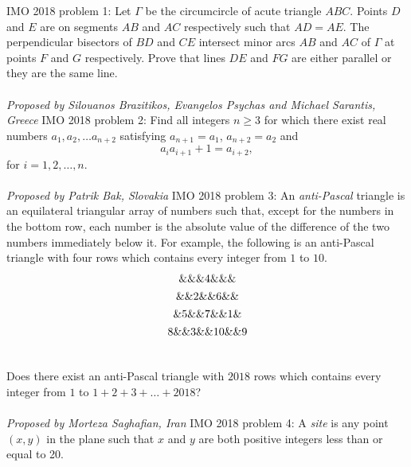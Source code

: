 IMO 2018 problem 1:  Let $\Gamma$ be the circumcircle of acute triangle $ABC$. Points $D$ and $E$ are on segments $AB$ and $AC$ respectively such that $AD = AE$. The perpendicular bisectors of $BD$ and $CE$ intersect minor arcs $AB$ and $AC$ of $\Gamma$ at points $F$ and $G$ respectively. Prove that lines $DE$ and $FG$ are either parallel or they are the same line. \\\\
\textit{Proposed by Silouanos Brazitikos, Evangelos Psychas and Michael Sarantis, Greece} 
IMO 2018 problem 2:  Find all integers $n \geq 3$ for which there exist real numbers $a_1, a_2, \dots a_{n + 2}$ satisfying $a_{n + 1} = a_1$, $a_{n + 2} = a_2$ and
\[ a_ia_{i + 1} + 1 = a_{i + 2}, \]
for $i = 1, 2, \dots, n$. \\\\
\textit{Proposed by Patrik Bak, Slovakia} 
IMO 2018 problem 3:  An \textit{anti-Pascal} triangle is an equilateral triangular array of numbers such that, except for the numbers in the bottom row, each number is the absolute value of the difference of the two numbers immediately below it. For example, the following is an anti-Pascal triangle with four rows which contains every integer from $1$ to $10$.
\[
\begin{array}{
c@{\hspace{4pt}}c@{\hspace{4pt}}
c@{\hspace{4pt}}c@{\hspace{2pt}}c@{\hspace{2pt}}c@{\hspace{4pt}}c
} \vspace{4pt}
 \& \& \& 4 \& \& \&  \\\vspace{4pt}
 \& \& 2 \& \& 6 \& \&  \\\vspace{4pt}
 \& 5 \& \& 7 \& \& 1 \& \\\vspace{4pt}
 8 \& \& 3 \& \& 10 \& \& 9 \\\vspace{4pt}
\end{array}
\]
Does there exist an anti-Pascal triangle with $2018$ rows which contains every integer from $1$ to $1 + 2 + 3 + \dots + 2018$? \\\\
\textit{Proposed by Morteza Saghafian, Iran} 
IMO 2018 problem 4:  A \textit{site} is any point $(x, y)$ in the plane such that $x$ and $y$ are both positive integers less than or equal to 20. \\\\
